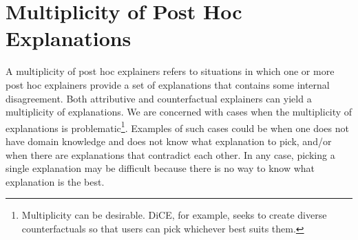 \documentclass[11pt]{article}    %
\begin{document}
            


\section{Multiplicity of Post Hoc Explanations}
        A multiplicity of post hoc explainers refers to situations in which one or more post hoc explainers provide a set of explanations that contains some internal disagreement. Both attributive and counterfactual explainers can yield a multiplicity of explanations.%
        We are concerned with cases when the multiplicity of explanations is problematic\footnote{Multiplicity can be desirable. DiCE, for example, seeks to create diverse counterfactuals so that users can pick whichever best suits them.}. Examples of such cases could be when one does not have domain knowledge and does not know what explanation to pick, and/or when there are explanations that contradict each other. In any case, picking a single explanation may be difficult because there is no way to know what explanation is the best. 
        
\end{document}

